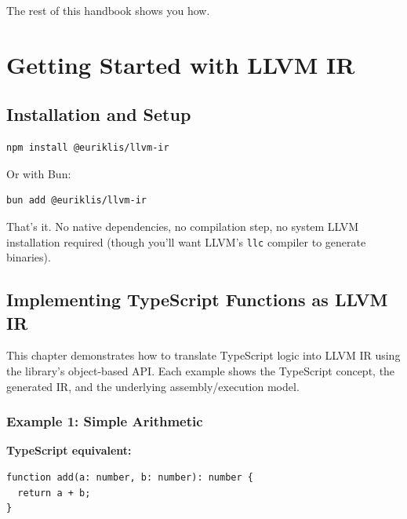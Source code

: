 \documentclass[11pt,oneside]{book}
\begin{document}
The rest of this handbook shows you how.

\part{Getting Started with LLVM IR}

\chapter{Installation and Setup}

\begin{lstlisting}[style=ts]
npm install @euriklis/llvm-ir
\end{lstlisting}

Or with Bun:
\begin{lstlisting}[style=ts]
bun add @euriklis/llvm-ir
\end{lstlisting}

That's it. No native dependencies, no compilation step, no system LLVM installation required (though you'll want LLVM's \texttt{llc} compiler to generate binaries).

\chapter{Implementing TypeScript Functions as LLVM IR}

This chapter demonstrates how to translate TypeScript logic into LLVM IR using the library's object-based API. Each example shows the TypeScript concept, the generated IR, and the underlying assembly/execution model.

\section{Example 1: Simple Arithmetic}

\textbf{TypeScript equivalent:}
\begin{lstlisting}[style=ts]
function add(a: number, b: number): number {
  return a + b;
}
\end{lstlisting}
\end{document}
